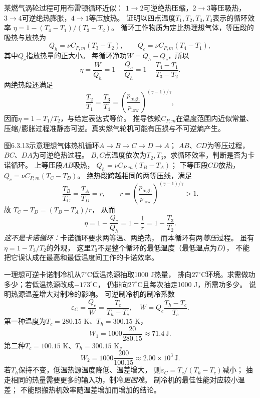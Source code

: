 \problemtext 某燃气涡轮过程可用布雷顿循环近似：
$1\to2$可逆绝热压缩，$2\to3$等压吸热，
$3\to4$可逆绝热膨胀，$4\to1$等压放热。
证明以四点温度$T_1,T_2,T_3,T_4$表示的循环效率
$\eta=1-(T_4-T_1)/(T_3-T_2)$。
\workings
循环工作物质为定比热理想气体，等压段的吸热与放热为
\[
Q_h=\nu C_{P,m}(T_3-T_2),\qquad
Q_c=\nu C_{P,m}(T_4-T_1),
\]
其中$Q_c$指放热量的正大小。
每循环净功$W=Q_h-Q_c$，所以
\[
\boxed{\eta=\frac{W}{Q_h}
=1-\frac{Q_c}{Q_h}
=1-\frac{T_4-T_1}{T_3-T_2}}.
\]
两绝热段还满足
\[
\frac{T_2}{T_1}=
\frac{T_3}{T_4}=
\left(\frac{p_{\mathrm{high}}}{p_{\mathrm{low}}}
\right)^{(\gamma-1)/\gamma},
\]
因而$\eta=1-T_1/T_2$，与给定表达式等价。
\crosscheck 推导依赖$C_{P,m}$在温度范围内近似常量、
压缩/膨胀过程准静态可逆。真实燃气轮机可能有压损与不可逆熵产生。

\problemtext 图6.3.13示意理想气体热机循环$A\to B\to C\to D\to A$；
$AB$、$CD$为等压过程，$BC$、$DA$为可逆绝热过程。
$B,C$点温度依次为$T_2,T_3$。求循环效率，判断是否为卡诺循环。
\workings
上等压段$AB$吸热，
$Q_h=\nu C_{P,m}(T_B-T_A)$；
下等压段$CD$放热，$Q_c=\nu C_{P,m}(T_C-T_D)$。
绝热段跨越相同的两等压线，满足
\[
\frac{T_B}{T_C}=\frac{T_A}{T_D}=r,
\qquad r=
\left(\frac{p_{\mathrm{high}}}{p_{\mathrm{low}}}
\right)^{(\gamma-1)/\gamma}>1.
\]
故
$T_C-T_D=(T_B-T_A)/r$，
从而
\[
\boxed{\eta=1-\frac{Q_c}{Q_h}
=1-\frac1r=1-\frac{T_3}{T_2}}.
\]
\emph{这不是卡诺循环：}卡诺循环要求两等温、两绝热，
而本循环有两\emph{等压}过程。
\crosscheck 虽有$\eta=1-T_3/T_2$的外观，
这里$T_3$不是整个循环的最低温度（最低温点为$D$），
不能把它误认成在最高和最低温度间工作的卡诺效率。

\problemtext 一理想可逆卡诺制冷机从$7^\circ$C低温热源抽取1000 J热量，
排向$27^\circ$C环境。求需做功多少；若低温热源改成$-173^\circ$C，
仍排向$27^\circ$C且每次抽走1000 J，所需功多少。
说明热源温差增大对制冷的影响。
\workings
可逆制冷机的制冷系数
\[
\varepsilon_C=\frac{Q_c}{W}
=\frac{T_c}{T_h-T_c},
\quad
\boxed{W=Q_c\frac{T_h-T_c}{T_c}}.
\]
第一种温度为$T_c=280.15$ K、$T_h=300.15$ K，
\[
\boxed{W_1=1000\frac{20}{280.15}\approx71.4\,\mathrm J}.
\]
第二种$T_c=100.15$ K、$T_h=300.15$ K，
\[
\boxed{W_2=1000\frac{200}{100.15}
\approx2.00\times10^3\,\mathrm J}.
\]
若$T_h$保持不变，低温热源温度降低、温差增大，
则$\varepsilon_C=T_c/(T_h-T_c)$减小；
抽走相同的热量需要更多的输入功，制冷\emph{更困难}。
\crosscheck 制冷机的最佳性能对应较小温差；
不能照搬热机效率随温差增加而增加的结论。

